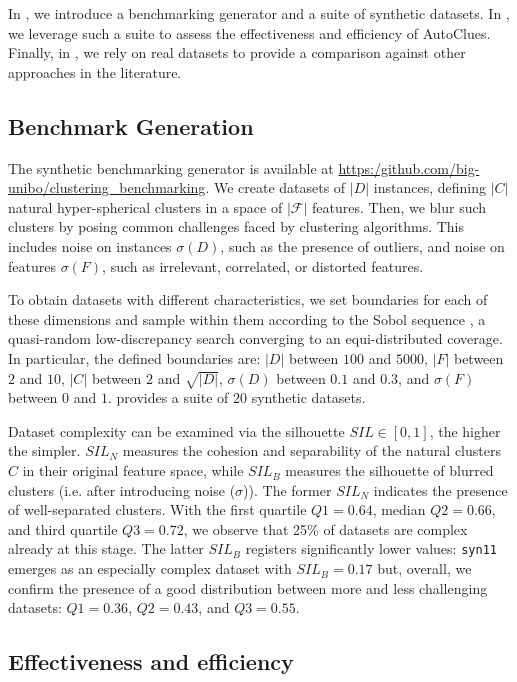 \documentclass[runningheads]{llncs}
\begin{document}
In , we introduce a benchmarking generator and a suite of synthetic datasets. In , we leverage such a suite to assess the effectiveness and efficiency of AutoClues.
Finally, in , we rely on real datasets to provide a comparison against other approaches in the literature.

\subsection{Benchmark Generation}
\label{ssec:benchmark}
The synthetic benchmarking generator is available at \url{https:/github.com/big-unibo/clustering_benchmarking}.
We create datasets of $|D|$ instances, defining $|C|$ natural hyper-spherical clusters in a space of $|\mathcal{F}|$ features.
Then, we blur such clusters by posing common challenges faced by clustering algorithms. 
This includes noise on instances $\sigma(D)$, such as the presence of outliers, and
noise on features $\sigma(F)$, such as irrelevant, correlated, or distorted features.

To obtain datasets with different characteristics, we set boundaries for each of these dimensions and sample within them according to the Sobol sequence \cite{sobol1967distribution}, a quasi-random low-discrepancy search converging to an equi-distributed coverage. 
In particular, the defined boundaries are: $|D|$ between $100$ and $5000$, $|F|$ between $2$ and $10$, $|C|$ between $2$ and $\sqrt{|D|}$, $\sigma(D)$ between $0.1$ and $0.3$, and $\sigma(F)$ between $0$ and $1$.
 provides a suite of $20$ synthetic datasets. 

Dataset complexity can be examined via the silhouette $SIL \in [0, 1]$, the higher the simpler. 
$SIL_N$ measures the cohesion and separability of the natural clusters $C$ in their original feature space, while  $SIL_B$ measures the silhouette of blurred clusters (i.e. after introducing noise ($\sigma$)).
The former $SIL_N$ indicates the presence of well-separated clusters.
With the first quartile $Q1=0.64$, median $Q2=0.66$, and third quartile $Q3=0.72$, we observe that 25\% of datasets are complex already at this stage. 
The latter $SIL_B$ registers significantly lower values: \texttt{syn11} emerges as an especially complex dataset with $SIL_B=0.17$ but, overall, we confirm the presence of a good distribution between more and less challenging datasets: $Q1 = 0.36$, $Q2 = 0.43$, and $Q3 = 0.55$.

\subsection{Effectiveness and efficiency}
\label{ssec:effectiveness}
\end{document}
